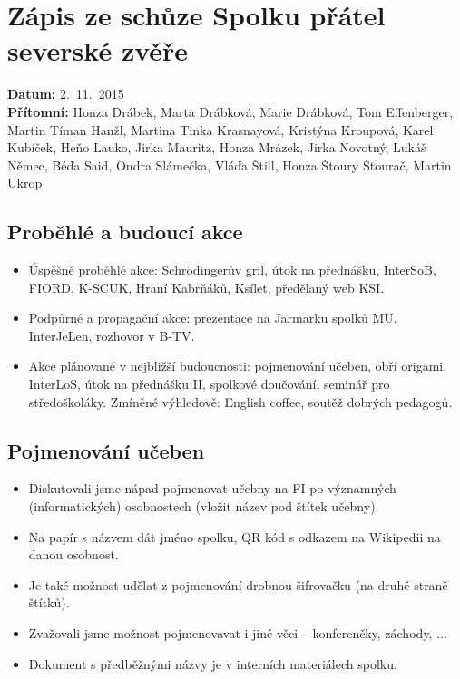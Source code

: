 \documentclass[11pt,a4paper]{article}
\begin{document}
\section*{Zápis ze schůze Spolku přátel severské zvěře}
\textbf{Datum:} 2.~11.~2015\\
\textbf{Přítomní:} Honza Drábek, Marta Drábková, Marie Drábková, Tom Effenberger, Martin Tíman Hanžl, Martina Tinka Krasnayová, Kristýna Kroupová, Karel Kubíček, Heňo Lauko, Jirka Mauritz, Honza Mrázek, Jirka Novotný, Lukáš Němec, Béďa Said, Ondra Slámečka, Vláďa Štill, Honza Štoury Štourač, Martin Ukrop

\subsection*{Proběhlé a budoucí akce}
\begin{itemize}[itemsep=0pt]
\item Úspěšně proběhlé akce: Schrödingerův gril, útok na přednášku, InterSoB, FIORD, K-SCUK, Hraní Kabrňáků, Ksílet, předělaný web KSI.
\item Podpůrné a propagační akce: prezentace na Jarmarku spolků MU, InterJeLen, rozhovor v B-TV.
\item Akce plánované v nejbližší budoucnosti: pojmenování učeben, obří origami, InterLoS, útok na přednášku II, spolkové doučování, seminář pro středoškoláky. Zmíněné výhledově: English coffee, soutěž dobrých pedagogů.
\end{itemize}

\subsection*{Pojmenování učeben}
\begin{itemize}[itemsep=0pt]
\item Diskutovali jsme nápad pojmenovat učebny na FI po významných (informatických) osobnostech (vložit název pod štítek učebny).
\item Na papír s názvem dát jméno spolku, QR kód s odkazem na Wikipedii na danou osobnost.
\item Je také možnost udělat z pojmenování drobnou šifrovačku (na druhé straně štítků).
\item Zvažovali jsme možnost pojmenovavat i jiné věci -- konferenčky, záchody, ...
\item Dokument s předběžnými názvy je v interních materiálech spolku.
\end{itemize}
\end{document}
